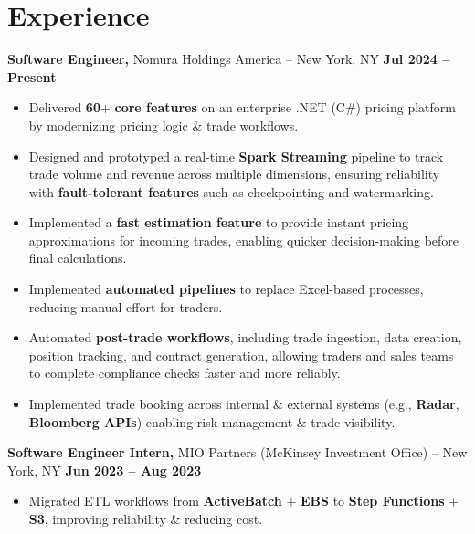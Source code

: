 \documentclass[letterpaper]{article}
\begin{document}
\section*{Experience}
\textbf{Software Engineer,} Nomura Holdings America -- New York, NY \hfill \textbf{Jul 2024 -- Present} \\
\vspace{2pt}
\begin{itemize}
  \item Delivered \textbf{60}+ \textbf{core features} on an enterprise .NET (C\#) pricing platform by modernizing pricing logic \& trade workflows.
  \item Designed and prototyped a real-time \textbf{Spark Streaming} pipeline to track trade volume and revenue across multiple dimensions, ensuring reliability with \textbf{fault-tolerant features} such as checkpointing and watermarking.
  \item Implemented a \textbf{fast estimation feature} to provide instant pricing approximations for incoming trades, enabling quicker decision-making before final calculations.
  \item Implemented \textbf{automated pipelines} to replace Excel-based processes, reducing manual effort for traders.
  \item Automated \textbf{post-trade workflows}, including trade ingestion, data creation, position tracking, and contract generation, allowing traders and sales teams to complete compliance checks faster and more reliably.
  \item Implemented trade booking across internal \& external systems (e.g., \textbf{Radar}, \textbf{Bloomberg APIs}) enabling risk management \& trade visibility.
\end{itemize}

\textbf{Software Engineer Intern,} MIO Partners (McKinsey Investment Office) -- New York, NY \hfill \textbf{Jun 2023 -- Aug 2023} \\
\vspace{2pt}
\begin{itemize}
  \item Migrated ETL workflows from \textbf{ActiveBatch} + \textbf{EBS} to \textbf{Step Functions} + \textbf{S3}, improving reliability \& reducing cost.
\end{itemize}
\end{document}
